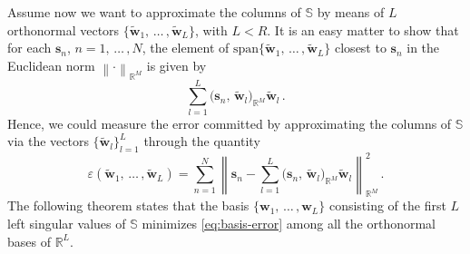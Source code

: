 \documentclass[12pt, a4paper, twoside, openright]{report}
\numberwithin{equation}{chapter}
\theoremstyle{theorem}
\theoremstyle{definition}
\theoremstyle{remark}
\theoremstyle{proposition}
\numberwithin{figure}{chapter}
\newcommand{\norm}[1]{\left\lVert#1\right\rVert}
\newcommand{\wt}[1]{\widetilde{#1}}
\begin{document}
		Assume now we want to approximate the columns of $\mathbb{S}$ by means of $L$ orthonormal vectors $\big\lbrace \wt{\mathbf{w}}_1, \, \ldots \, , \wt{\mathbf{w}}_L \big\rbrace$, with $L < R$. It is an easy matter to show that for each $\mathbf{s}_n$, $n = 1, \, \ldots \, , N$, the element of $\text{span} \big\lbrace \wt{\mathbf{w}}_1, \, \ldots \, , \wt{\mathbf{w}}_L \big\rbrace$ closest to $\mathbf{s}_n$ in the Euclidean norm $\norm{\cdot}_{\mathbb{R}^M}$ is given by
		\begin{equation*}
			\sum_{l = 1}^L \big( \mathbf{s}_n, \, \wt{\mathbf{w}}_l \big)_{\mathbb{R}^M} \wt{\mathbf{w}}_l \, .
		\end{equation*} 
		Hence, we could measure the error committed by approximating the columns of $\mathbb{S}$ via the vectors $\big\lbrace \wt{\mathbf{w}}_l \big\rbrace_{l = 1}^L$ through the quantity
		\begin{equation}
			\label{eq:basis-error}
			\varepsilon(\wt{\mathbf{w}}_1, \, \ldots \, , \wt{\mathbf{w}}_L) = \sum_{n = 1}^N \norm{\mathbf{s}_n - \sum_{l = 1}^L \big( \mathbf{s}_n, \, \wt{\mathbf{w}}_l \big)_{\mathbb{R}^M} \wt{\mathbf{w}}_l}_{\mathbb{R}^M}^2 \, .
		\end{equation}
		The following theorem states that the basis $\big\lbrace \mathbf{w}_1, \, \ldots \, , \mathbf{w}_L \big\rbrace$ consisting of the first $L$ left singular values of $\mathbb{S}$ minimizes \eqref{eq:basis-error} among all the orthonormal bases of $\mathbb{R}^L$.
		
\end{document}
